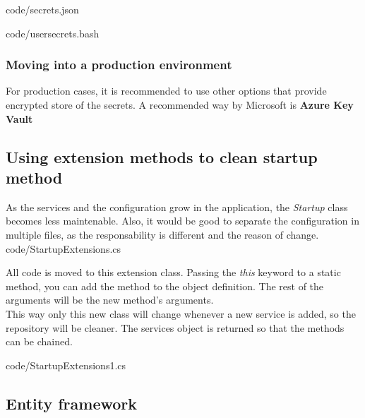         
        {code/secrets.json}

        
        {code/usersecrets.bash}

        \subsubsection{Moving into a production environment}
        For production cases, it is recommended to use other options that provide encrypted store of the secrets. A recommended way by Microsoft is \textbf{Azure Key Vault} \cite{AKV}

    \subsection{Using extension methods to clean startup method}
    As the services and the configuration grow in the application, the \textit{Startup} class becomes less maintenable. Also, it would be good to separate the configuration in multiple files, as the responsability is different and the reason of change. \\
    
    
    {code/StartupExtensions.cs}

    All code is moved to this extension class. Passing the \textit{this} keyword to a static method, you can add the method to the object definition. The rest of the arguments will be the new method's arguments. \\
    This way only this new class will change whenever a new service is added, so the repository will be cleaner. The services object is returned so that the methods can be chained.
    
    {code/StartupExtensions1.cs}

    \subsection{Entity framework}
